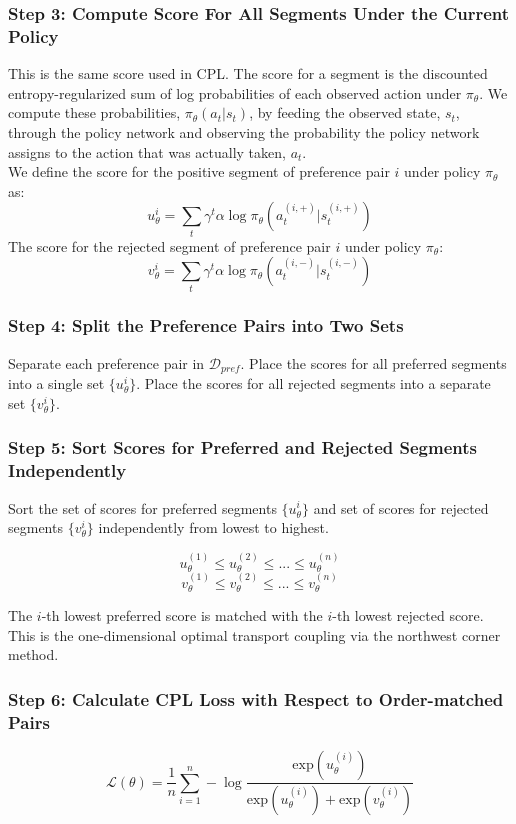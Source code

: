 \documentclass[11pt]{article}
\begin{document}
\subsubsection*{Step 3: Compute Score For All Segments Under the Current Policy}
This is the same score used in CPL. The score for a segment is the discounted entropy-regularized sum of log probabilities of each observed action under $\pi_\theta$. We compute these probabilities, $\pi_\theta(a_t|s_t)$, by feeding the observed state, $s_t$, through the policy network and observing the probability the policy network assigns to the action that was actually taken, $a_t$.\\
We define the score for the positive segment of preference pair $i$ under policy $\pi_\theta$ as:
$$u_\theta^i=\sum_{t}\gamma^t \alpha \log \pi_\theta(a_t^{(i,+)}|s_t^{(i,+)})$$
The score for the rejected segment of preference pair $i$ under policy $\pi_\theta$:\\
$$v_\theta^i=\sum_{t}\gamma^t \alpha \log \pi_\theta(a_t^{(i,-)}|s_t^{(i,-)})$$

\subsubsection*{Step 4: Split the Preference Pairs into Two Sets}
Separate each preference pair in $\mathcal{D}_{pref}$. Place the scores for all preferred segments into a single set $\{u_\theta^i\}$. Place the scores for all rejected segments into a separate set $\{v_\theta^i\}$.

\subsubsection*{Step 5: Sort Scores for Preferred and Rejected Segments Independently}
Sort the set of scores for preferred segments $\{u_\theta^i\}$ and set of scores for rejected segments $\{v_\theta^i\}$ independently from lowest to highest.

$$u_\theta^{(1)} \leq u_\theta^{(2)} \leq ...\leq u_\theta^{(n)}$$
$$v_\theta^{(1)} \leq v_\theta^{(2)} \leq ...\leq v_\theta^{(n)}$$

The $i$-th lowest preferred score is matched with the $i$-th lowest rejected score. This is the one-dimensional optimal transport coupling via the northwest corner method.

\subsubsection*{Step 6: Calculate CPL Loss with Respect to Order-matched Pairs}
$$\mathcal{L}(\theta)=\frac{1}{n}\sum_{i=1}^{n}-\log \frac{\text{exp}(u_\theta^{(i)})}{\text{exp}(u_\theta^{(i)})+\text{exp}(v_\theta^{(i)})}$$
\end{document}
